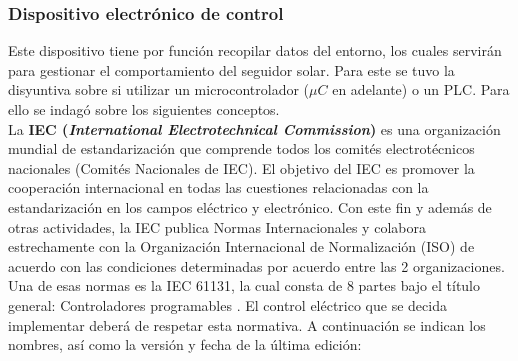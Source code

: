 \newpage
\subsubsection{Dispositivo electrónico de control}
Este dispositivo tiene por función recopilar datos del entorno, los cuales servirán para gestionar el comportamiento del seguidor solar. Para este se tuvo la disyuntiva sobre si utilizar un microcontrolador ($ \mu C $ en adelante) o un PLC. Para ello se indagó sobre los siguientes conceptos. \\

La \textbf{IEC (\textit{International Electrotechnical Commission})} es una organización mundial de estandarización que comprende todos los comités electrotécnicos nacionales (Comités Nacionales de IEC). El objetivo del IEC es promover la cooperación internacional en todas las cuestiones relacionadas con la estandarización en los campos eléctrico y electrónico. Con este fin y además de otras actividades, la IEC publica Normas Internacionales y colabora estrechamente con la Organización Internacional de Normalización (ISO) de acuerdo con las condiciones determinadas por acuerdo entre las 2 organizaciones.\\

Una de esas normas es la IEC 61131, la cual consta de 8 partes bajo el título general: Controladores programables \cite{DDC5}. El control eléctrico que se decida implementar deberá de respetar esta normativa. A continuación se indican los nombres, así como la versión y fecha de la última edición:

